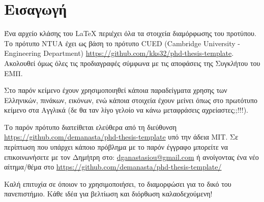 
\chapter{Εισαγωγή}  %

\ifpdf
    \graphicspath{{Chapter1/Figs/Raster/}{Chapter1/Figs/PDF/}{Chapter1/Figs/}}
\else
    \graphicspath{{Chapter1/Figs/Vector/}{Chapter1/Figs/}}
\fi

Ένα αρχείο κλάσης του \LaTeX {} περιέχει όλα τα στοιχεία διαμόρφωσης του προτύπου. Το πρότυπο NTUA έχει ως βάση το πρότυπο CUED (Cambridge University - Engineering Department) \url{https://github.com/kks32/phd-thesis-template}. Ακολουθεί όμως όλες τις προδιαγραφές σύμφωνα με τις αποφάσεις της Συγκλήτου του ΕΜΠ.

Στο παρόν κείμενο έχουν χρησιμοποιηθεί κάποια παραδείγματα χρησης των Ελληνικών, πινάκων, εικόνων, ενώ κάποια στοιχεία έχουν μείνει όπως στο πρωτότυπο κείμενο στα Αγγλικά (δε θα ταν λίγο γελοίο να κάνω μεταφράσεις αχρείαστες;;!!!).

Το παρόν πρότυπο διατείθεται ελεύθερα από τη διεύθυνση \url{https://github.com/demanasta/phd-thesis-template} υπό την άδεια ΜΙΤ. Σε περίπτωση που υπάρχει κάποιο πρόβλημα με το παρόν έγγραφο μπορείτε να επικοινωνήσετε με τον Δημήτρη στο: \href{mailto:dganastasiou@gmail.com}{dganastasiou@gmail.com} ή ανοίγοντας ένα νέο αίτημα/θέμα στο \url{https://github.com/demanasta/phd-thesis-template/}

Καλή επιτυχία σε όποιον το χρησιμοποιήσει, το διαμορφώσει για το δικό του πανεπιστήμιο. Κάθε ιδέα για βελτίωση και διόρθωση καλαοδεχούμενη!

